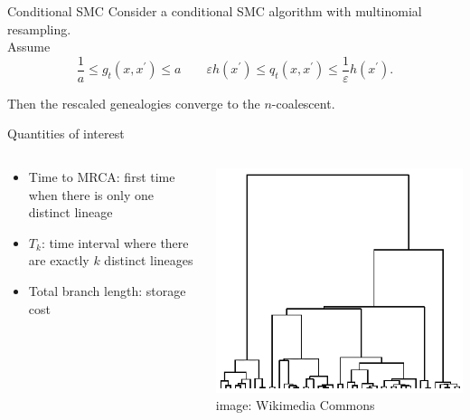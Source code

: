 \documentclass[aspectratio=169]{beamer}
\theoremstyle{definition}
\begin{document}
\begin{frame}{Conditional SMC}
Consider a conditional SMC algorithm with multinomial resampling.\\[10pt]
\pause
Assume
\begin{equation*}
\frac{1}{a} \leq g_t(x, x^\prime) \leq a \qquad
\varepsilon h(x^\prime) \leq q_t(x, x^\prime) \leq \frac{1}{\varepsilon} h(x^\prime) .
\end{equation*}

\pause
Then the rescaled genealogies converge to the $n$-coalescent.
\end{frame}


\begin{frame}{Quantities of interest}
\begin{columns}
\begin{column}{0.45\textwidth}
\begin{itemize}[<+->]
\item Time to MRCA: first time when there is only one distinct lineage
\item $T_k$: time interval where there are exactly $k$ distinct lineages
\item Total branch length: storage cost
\end{itemize}
\end{column}
\begin{column}{0.45\textwidth}
\includegraphics[width=\textwidth]{kingman.png}
\hspace*{\fill} \tiny{image: Wikimedia Commons}
\end{column}
\end{columns}
\end{frame}
\end{document}
